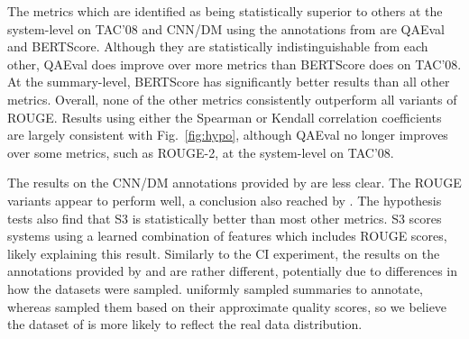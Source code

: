The metrics which are identified as being statistically superior to others at the system-level on TAC'08 and CNN/DM using the annotations from \citet{FKMSR21} are QAEval and BERTScore.
Although they are statistically indistinguishable from each other, QA\-Eval does improve over more metrics than BERTScore does on TAC'08.
At the summary-level, BERTScore has significantly better results than all other metrics.
Overall, none of the other metrics consistently outperform all variants of ROUGE.
Results using either the Spearman or Kendall correlation coefficients are largely consistent with Fig.~\ref{fig:hypo}, although QA\-Eval no longer improves over some metrics, such as ROUGE-2, at the system-level on TAC'08.

The results on the CNN/DM annotations provided by \citet{BGALN20} are less clear.
The ROUGE variants appear to perform well, a conclusion also reached by \citet{BGALN20}.
The hypothesis tests also find that S3 is statistically better than most other metrics.
S3 scores systems using a learned combination of features which includes ROUGE scores, likely explaining this result.
Similarly to the CI experiment, the results on the annotations provided by \citet{BGALN20} and \citet{FKMSR21} are rather different, potentially due to differences in how the datasets were sampled.
\citet{FKMSR21} uniformly sampled summaries to annotate, whereas \citet{BGALN20} sampled them based on their approximate quality scores, so we believe the dataset of \citet{FKMSR21} is more likely to reflect the real data distribution.

